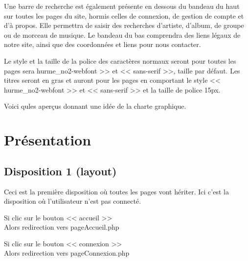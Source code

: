 	\begin{paragraphe}
		Une barre de recherche est également présente en dessous du bandeau du haut sur toutes les pages du site, hormis celles de connexion, de gestion de compte et d'à propos.
		Elle permettra de saisir des recherches d'artiste, d'album, de groupe ou de morceau de musique.
		Le bandeau du bas comprendra des liens légaux de notre site, ainsi que des coordonnées et liens pour nous contacter.

	\end{paragraphe}

	\begin{paragraphe}
		Le style et la taille de la police des caractères normaux seront pour toutes les pages sera \og hurme\_no2-webfont >> et << sans-serif >>,
		 taille par défaut. Les titres seront en gras et auront pour les pages en comportant le style << hurme\_no2-webfont >> et << sans-serif >> et la taille de police 15px.
	\end{paragraphe}

	\begin{paragraphe}
		Voici qules aperçus donnant une idée de la charte graphique.
	\end{paragraphe}

\newpage

\section{Présentation}
	\subsection{Disposition 1 (layout)}
	
		\begin{paragraphe}
			Ceci est la première disposition où toutes les pages vont hériter. Ici c'est la disposition où l'utilisateur n'est pas connecté.
		\end{paragraphe}

		\begin{paragraphe}
			Si clic sur le bouton << accueil >> \\
			Alors redirection vers pageAccueil.php
		\end{paragraphe}

		\begin{paragraphe}
			Si clic sur le bouton << connexion >> \\
			Alors redirection vers pageConnexion.php
		\end{paragraphe}
		
